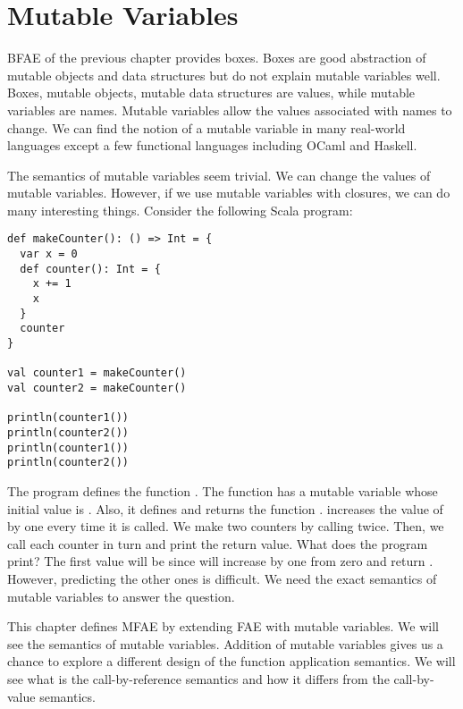 \setchapterpreamble[u]{\margintoc}
\chapter{Mutable Variables}

\renewcommand{\plang}{\textsf{FAE}\xspace}
\newcommand{\bfae}{\textsf{BFAE}\xspace}
\renewcommand{\lang}{\textsf{MFAE}\xspace}

\bfae of the previous chapter provides boxes. Boxes are good abstraction
of mutable objects and data structures but do not explain mutable variables
well. Boxes, mutable objects, mutable data structures are values, while mutable
variables are names. Mutable variables allow the values associated with
names to change. We can find the notion of a mutable variable in many
real-world languages except a few functional languages including OCaml and
Haskell.

The semantics of mutable variables seem trivial. We can change the values of
mutable variables. However, if we use mutable variables with closures, we can do
many interesting things. Consider the following Scala program:

\begin{verbatim}
def makeCounter(): () => Int = {
  var x = 0
  def counter(): Int = {
    x += 1
    x
  }
  counter
}

val counter1 = makeCounter()
val counter2 = makeCounter()

println(counter1())
println(counter2())
println(counter1())
println(counter2())
\end{verbatim}

The program defines the function . The function has a mutable
variable  whose initial value is . Also, it defines and returns the function
.  increases the value of  by
one every time it is called. We make two counters by calling 
twice. Then, we call each counter in turn and print the return value.
What does the program print? The first value will be  since
 will increase  by one from zero and return .
However, predicting the other ones is difficult. We need the exact semantics of
mutable variables to answer the question.

This chapter defines \lang by extending \plang with mutable variables.
We will see the semantics of mutable variables. Addition of mutable
variables gives us a chance to explore a different design of the function
application semantics. We will see what is the call-by-reference semantics and how
it differs from the call-by-value semantics.

